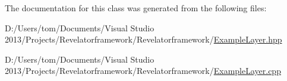 The documentation for this class was generated from the following files\-:\begin{DoxyCompactItemize}
\item 
D\-:/\-Users/tom/\-Documents/\-Visual Studio 2013/\-Projects/\-Revelatorframework/\-Revelatorframework/\hyperlink{_example_layer_8hpp}{Example\-Layer.\-hpp}\item 
D\-:/\-Users/tom/\-Documents/\-Visual Studio 2013/\-Projects/\-Revelatorframework/\-Revelatorframework/\hyperlink{_example_layer_8cpp}{Example\-Layer.\-cpp}\end{DoxyCompactItemize}
